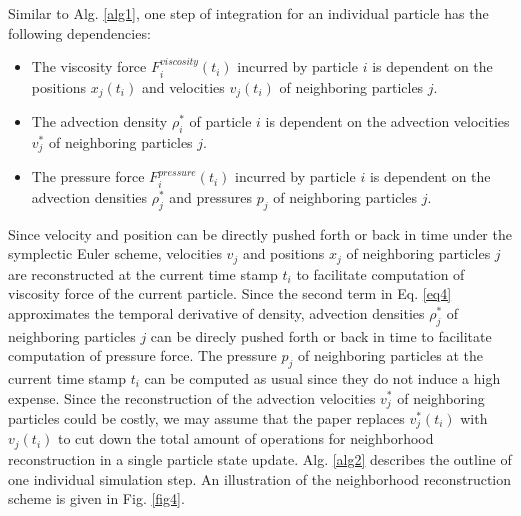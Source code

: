 \documentclass[
	11pt, 
	DIV10,
	ngerman,
	a4paper, 
	oneside, 
	headings=normal, 
	captions=tableheading,
	final, 
	numbers=noenddot
]{scrartcl}
\begin{document}
\par
Similar to Alg. \ref{alg1}, one step of integration for an individual particle has the following dependencies:

\begin{itemize}
    \item The viscosity force $ F_{i}^{viscosity}(t_{i}) $ incurred by particle $i$ is dependent on the positions $ x_{j}(t_{i}) $ and velocities $ v_{j}(t_{i}) $ of neighboring particles $j$.
    \item The advection density $ \rho_{i}^{*} $ of particle $i$ is dependent on the advection velocities $ v_{j}^{*} $ of neighboring particles $j$.
    \item The pressure force $ F_{i}^{pressure}(t_{i}) $ incurred by particle $i$ is dependent on the advection densities $ \rho_{j}^{*} $ and pressures $ p_{j} $ of neighboring particles $j$.
\end{itemize}

Since velocity and position can be directly pushed forth or back in time under the symplectic Euler scheme, velocities $ v_{j} $ and positions $ x_{j} $ of neighboring particles $j$ are reconstructed at the current time stamp $ t_{i} $ to facilitate computation of viscosity force of the current particle. Since the second term in Eq. \eqref{eq4} approximates the temporal derivative of density, advection densities $ \rho_{j}^{*} $ of neighboring particles $j$ can be direcly pushed forth or back in time to facilitate computation of pressure force. The pressure $ p_{j} $ of neighboring particles at the current time stamp $ t_{i} $ can be computed as usual since they do not induce a high expense. Since the reconstruction of the advection velocities $ v_{j}^{*} $ of neighboring particles could be costly, we may assume that the paper replaces $ v_{j}^{*}(t_{i}) $ with $ v_{j}(t_{i}) $ to cut down the total amount of operations for neighborhood reconstruction in a single particle state update. Alg. \ref{alg2} describes the outline of one individual simulation step. An illustration of the neighborhood reconstruction scheme is given in Fig. \ref{fig4}.
\end{document}
